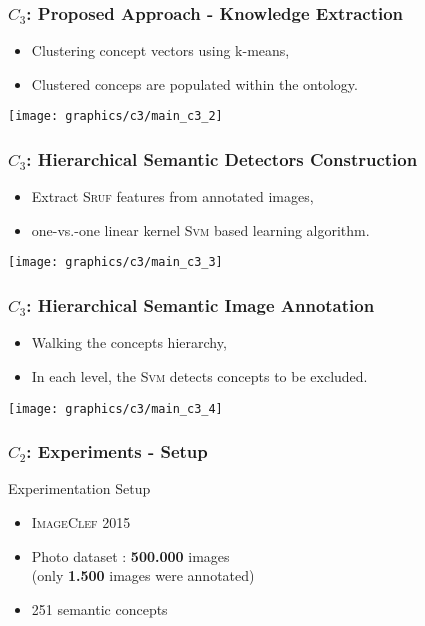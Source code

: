 \begin{frame}
	\frametitle{$C_{3}$: Proposed Approach - Knowledge Extraction}
	\begin{block}{}
	 \begin{itemize}
	  \item Clustering concept vectors using \alert{k-means},
	  \item Clustered conceps are populated within the ontology.
	 \end{itemize}
	\end{block}
	\hspace*{-1cm}\centering\texttt{[image: graphics/c3/main\_c3\_2]}
\end{frame}


\begin{frame}
	\frametitle{$C_{3}$: Hierarchical Semantic Detectors Construction}
	\begin{block}{}
	 \begin{itemize}
	  \item Extract \alert{\textsc{Sruf}} features from annotated images,
	  \item one-vs.-one linear kernel \alert{\textsc{Svm}} based learning algorithm.
	 \end{itemize}
	\end{block}
	\hspace*{-1cm}\centering\texttt{[image: graphics/c3/main\_c3\_3]}
\end{frame}

\begin{frame}
	\frametitle{$C_{3}$: Hierarchical Semantic Image Annotation}
	\begin{block}{}
	 \begin{itemize}
	  \item \alert{Walking} the concepts hierarchy,
	  \item In each level, the \textsc{Svm} detects concepts to be \alert{excluded}.
	 \end{itemize}
	\end{block}
	\hspace*{-1cm}\centering\texttt{[image: graphics/c3/main\_c3\_4]}
\end{frame}

\begin{frame}
	\frametitle{$C_{2}$: Experiments - Setup}
	\begin{exampleblock}{Experimentation Setup}
		{\small
		\begin{itemize}		
			\item \textsc{ImageClef 2015}
			\item Photo dataset : \alert{\textbf{500.000}} images \\ (only \textbf{1.500} images were annotated)
			\item \alert{251} semantic concepts
		\end{itemize}
		}
	\end{exampleblock}
\end{frame}

